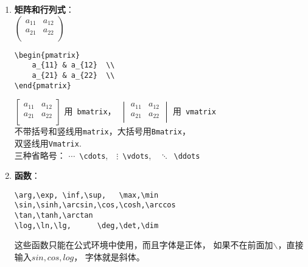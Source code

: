 \documentclass{article}
\begin{document}
\begin{multicols}{2}
\begin{enumerate}
        \item \textbf{矩阵和行列式}：\\
              $ \begin{pmatrix}
                      a_{11} & a_{12} \\
                      a_{21} & a_{22} \\
                  \end{pmatrix} $
              \begin{lstlisting}
\begin{pmatrix}
    a_{11} & a_{12}  \\
    a_{21} & a_{22}  \\
\end{pmatrix}    
\end{lstlisting}
              $ \begin{bmatrix}
                      a_{11} & a_{12} \\
                      a_{21} & a_{22} \\
                  \end{bmatrix} $ 用\, \verb|bmatrix|，\
              $ \begin{vmatrix}
                      a_{11} & a_{12} \\
                      a_{21} & a_{22} \\
                  \end{vmatrix} $ 用\, \verb|vmatrix| \\
              不带括号和竖线用\verb|matrix|，大括号用\verb|Bmatrix|，\\
              双竖线用\verb|Vmatrix|.\\
              三种省略号：
              $ \cdots $\  \verb|\cdots|,\ \
              $ \vdots $\  \verb|\vdots|,\ \
              $ \ddots $\  \verb|\ddots|

        \item \textbf{函数}：
              \begin{lstlisting}
\arg,\exp, \inf,\sup,   \max,\min
\sin,\sinh,\arcsin,\cos,\cosh,\arccos
\tan,\tanh,\arctan
\log,\ln,\lg,      \deg,\det,\dim     
\end{lstlisting}
              这些函数只能在公式环境中使用，而且字体是正体，
              如果不在前面加$ \backslash $，直接输入$ sin,cos,log $，
              字体就是斜体。


\end{enumerate}
\end{multicols}
\end{document}
